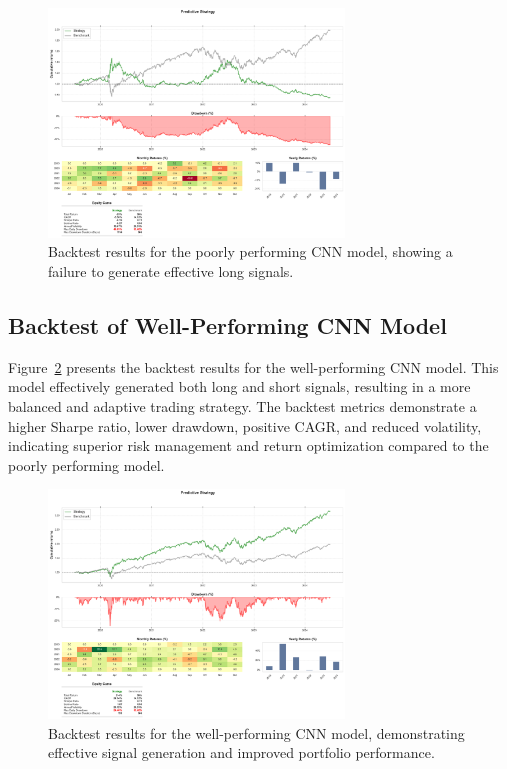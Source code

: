 \begin{figure}[h!]
    \centering
    \includegraphics[width=0.7\textwidth]{chapters/Chap3/Model_Fail_Backtest.png}
    \caption{Backtest results for the poorly performing CNN model, showing a failure to generate effective long signals.}
    \label{fig:failed_backtest}
\end{figure}

\subsection{Backtest of Well-Performing CNN Model}

Figure~\ref{fig:successful_backtest} presents the backtest results for the well-performing CNN model. This model effectively generated both long and short signals, resulting in a more balanced and adaptive trading strategy. The backtest metrics demonstrate a higher Sharpe ratio, lower drawdown, positive CAGR, and reduced volatility, indicating superior risk management and return optimization compared to the poorly performing model.

\begin{figure}[h!]
    \centering
    \includegraphics[width=0.7\textwidth]{chapters/Chap3/Model_Working_Backtest.png}
    \caption{Backtest results for the well-performing CNN model, demonstrating effective signal generation and improved portfolio performance.}
    \label{fig:successful_backtest}
\end{figure}

